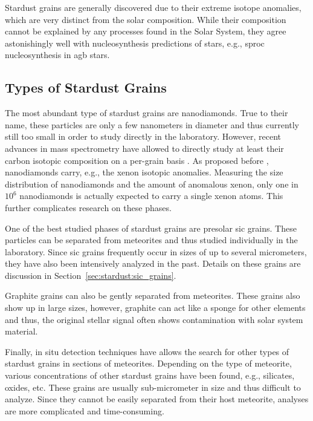 Stardust grains are generally discovered due to their extreme isotope anomalies, which are very distinct from the solar composition. While their composition cannot be explained by any processes found in the Solar System, they agree astonishingly well with nucleosynthesis predictions of stars, e.g., \ac{sproc} nucleosynthesis in \ac{agb} stars.


\subsection{Types of Stardust Grains}

The most abundant type of stardust grains are nanodiamonds. True to their name, these particles are only a few nanometers in diameter and thus currently still too small in order to study directly in the laboratory. However, recent advances in mass spectrometry have allowed to directly study at least their carbon isotopic composition on a per-grain basis \citep{heck14}. As proposed before \citep{lewis87}, nanodiamonds carry, e.g., the xenon isotopic anomalies. Measuring the size distribution of nanodiamonds and the amount of anomalous xenon, only one in $10^6$ nanodiamonds is actually expected to carry a single xenon atoms. This further complicates research on these phases.

One of the best studied phases of stardust grains are presolar \ac{sic} grains. These particles can be separated from meteorites and thus studied individually in the laboratory. Since \ac{sic} grains frequently occur in sizes of up to several micrometers, they have also been intensively analyzed in the past. Details on these grains are discussion in Section~\ref{sec:stardust:sic_grains}.

Graphite grains can also be gently separated from meteorites. These grains also show up in large sizes, however, graphite can act like a sponge for other elements and thus, the original stellar signal often shows contamination with solar system material.

Finally, in situ detection techniques have allows the search for other types of stardust grains in sections of meteorites. Depending on the type of meteorite, various concentrations of other stardust grains have been found, e.g., silicates, oxides, etc. These grains are usually sub-micrometer in size and thus difficult to analyze. Since they cannot be easily separated from their host meteorite, analyses are more complicated and time-consuming.




